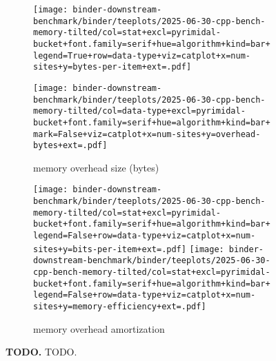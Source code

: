 \begin{figure}


\begin{subfigure}{\linewidth}
\centering
\texttt{[image: binder-downstream-benchmark/binder/teeplots/2025-06-30-cpp-bench-memory-tilted/col=stat+excl=pyrimidal-bucket+font.family=serif+hue=algorithm+kind=bar+legend=True+row=data-type+viz=catplot+x=num-sites+y=bytes-per-item+ext=.pdf]}

\texttt{[image: binder-downstream-benchmark/binder/teeplots/2025-06-30-cpp-bench-memory-tilted/col=data-type+excl=pyrimidal-bucket+font.family=serif+hue=algorithm+kind=bar+mark=False+viz=catplot+x=num-sites+y=overhead-bytes+ext=.pdf]}

\caption{memory overhead size (bytes)}
\end{subfigure}

\begin{subfigure}{\linewidth}
\texttt{[image: binder-downstream-benchmark/binder/teeplots/2025-06-30-cpp-bench-memory-tilted/col=stat+excl=pyrimidal-bucket+font.family=serif+hue=algorithm+kind=bar+legend=False+row=data-type+viz=catplot+x=num-sites+y=bits-per-item+ext=.pdf]}%
\texttt{[image: binder-downstream-benchmark/binder/teeplots/2025-06-30-cpp-bench-memory-tilted/col=stat+excl=pyrimidal-bucket+font.family=serif+hue=algorithm+kind=bar+legend=False+row=data-type+viz=catplot+x=num-sites+y=memory-efficiency+ext=.pdf]}
\caption{memory overhead amortization}
\end{subfigure}

\vspace{-2ex}

\caption{%
\textbf{TODO.}
\small
TODO.
}
\label{fig:memory}
\end{figure}
